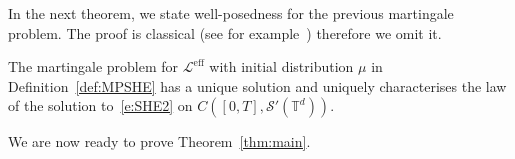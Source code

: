 \documentclass[reqno,11pt]{preprint}
\newcommand{\T}{\mathbb{T}}
\renewcommand{\P}{\mathbb{P}}
\newcommand{\cD}{\mathcal{D}}
\newcommand{\cL}{\mathcal{L}}
\newcommand{\cS}{\mathcal{S}}
\newcommand{\eff}{\mathrm{eff}}
\newcommand{\1}{\mathds{1}}
\newcommand{\geneff}{\cL^\eff}
\begin{document}
In the next theorem, we state well-posedness for the previous martingale problem. 
The proof is classical (see for example~\cite[Theorem D.1]{MW}) therefore we omit it. 

\begin{theorem}\label{thm:WellPosedMP}
The martingale problem for $\geneff$ with initial distribution $\mu$ in Definition~\ref{def:MPSHE} has a unique solution 
and uniquely characterises the law of the solution to~\eqref{e:SHE2} on $C([0,T], \cS'(\T^d))$.
\end{theorem}

We are now ready to prove Theorem~\ref{thm:main}. 
\end{document}
